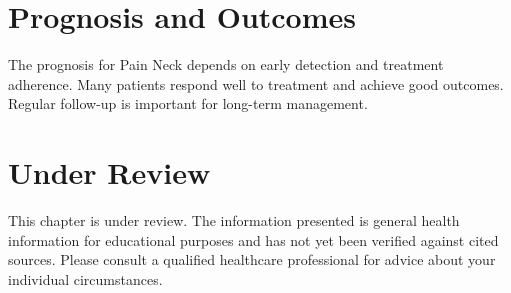 \section*{Prognosis and Outcomes}
The prognosis for Pain Neck depends on early detection and treatment adherence. Many patients respond well to treatment and achieve good outcomes. Regular follow-up is important for long-term management.
\section*{Under Review}
This chapter is under review. The information presented is general health information for educational purposes and has not yet been verified against cited sources. Please consult a qualified healthcare professional for advice about your individual circumstances.


\clearpage
